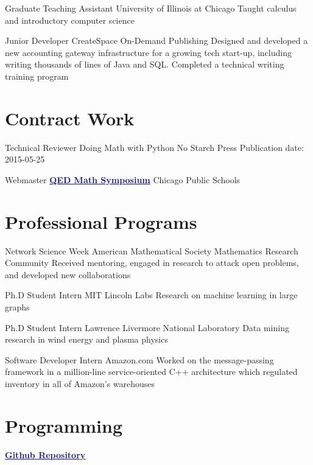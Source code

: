 \documentclass[11pt]{moderncv}
\begin{document}
         {Graduate Teaching Assistant}
      {University of Illinois at Chicago}
      {}
      {}
      {Taught calculus and introductory computer science}

         {Junior Developer}
      {CreateSpace On-Demand Publishing}
      {}
      {}
      {Designed and developed a new accounting gateway infrastructure for a growing tech start-up, including writing thousands of lines of Java and SQL. Completed a technical writing training program}


   \section{Contract Work}
         {Technical Reviewer}
      {Doing Math with Python}
      {No Starch Press}
      {}
      {Publication date: 2015-05-25}

         {Webmaster}
      {\href{http://qed.wpcp.org/}{\textcolor{MidnightBlue}{\underline{\textbf{QED Math Symposium}}}}}
      {Chicago Public Schools}
      {}
{}


   \section{Professional Programs}
         {Network Science Week}
      {American Mathematical Society Mathematics Research Community}
      {}
      {}
      {Received mentoring, engaged in research to attack open problems, and developed new collaborations}

         {Ph.D Student Intern}
      {MIT Lincoln Labs}
      {}
      {}
      {Research on machine learning in large graphs}

         {Ph.D Student Intern}
      {Lawrence Livermore National Laboratory}
      {}
      {}
      {Data mining research in wind energy and plasma physics}

         {Software Developer Intern}
      {Amazon.com}
      {}
      {}
      {Worked on the message-passing framework in a million-line service-oriented C++ architecture which regulated inventory in all of Amazon's warehouses}


   \section{Programming}
         {\href{https://github.com/j2kun/}{\textcolor{MidnightBlue}{\underline{\textbf{Github Repository}}}}}
      {}
{}
      {}
      {}
\end{document}

